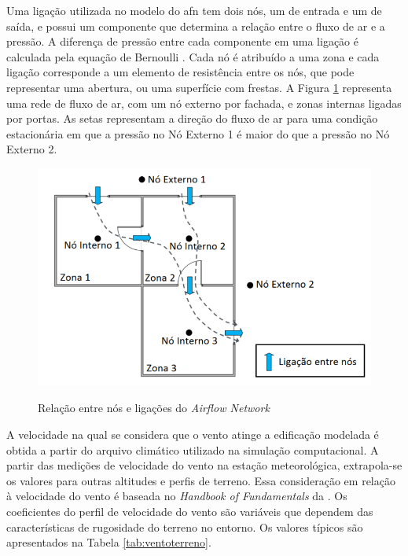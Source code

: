 Uma ligação utilizada no modelo do \acrshort{afn} tem dois nós, um de entrada e um de saída, e possui um componente que determina a relação entre o fluxo de ar e a pressão. A diferença de pressão entre cada componente em uma ligação é calculada pela equação de Bernoulli \cite{Walton1989}. Cada nó é atribuído a uma zona e cada ligação corresponde a um elemento de resistência entre os nós, que pode representar uma abertura, ou uma superfície com frestas. A Figura \ref{fig:nos_AFN} representa uma rede de fluxo de ar, com um nó externo por fachada, e zonas internas ligadas por portas. As setas representam a direção do fluxo de ar para uma condição estacionária em que a pressão no Nó Externo 1 é maior do que a pressão no Nó Externo 2.

\begin{figure}[]
	\centering
	\caption{Relação entre nós e ligações do \textit{Airflow Network}}
	\includegraphics[width=.7\linewidth]{img/nos_AFN.png}
	\label{fig:nos_AFN}
\end{figure}

A velocidade na qual se considera que o vento atinge a edificação modelada é obtida a partir do arquivo climático utilizado na simulação computacional. A partir das medições de velocidade do vento na estação meteorológica, extrapola-se os valores para outras altitudes e perfis de terreno. Essa consideração em relação à velocidade do vento é baseada no \textit{Handbook of Fundamentals} da .
Os coeficientes do perfil de velocidade do vento são variáveis que dependem das características de rugosidade do terreno no entorno. Os valores típicos são apresentados na Tabela \ref{tab:ventoterreno}.

